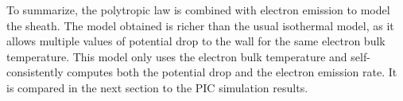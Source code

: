 \vspace{1em}
To summarize, the polytropic law is combined with electron emission to model the sheath.
The model obtained is richer than the usual isothermal model, as it allows multiple values of potential drop to the wall for the same electron bulk temperature.
This model only uses the electron bulk temperature and self-consistently computes both the potential drop and the electron emission rate.
It is compared in the next section to the \ac{PIC} simulation results.


\let\rightmark=\oldrightmark
